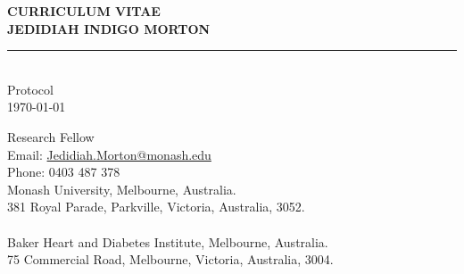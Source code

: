 \documentclass[11pt]{article}
\newcommand{\thedate}{\today}
\begin{document}
\begin{titlepage}
    \begin{center}
        \Huge
        \textbf{CURRICULUM VITAE \\
JEDIDIAH INDIGO MORTON}
\rule{16cm}{2mm} \\
\Large
Protocol \\
\thedate \\
       \vfill
    \end{center}
        \Large

\noindent
Research Fellow \\
\color{blue}
Email: \href{mailto:Jedidiah.Morton@Monash.edu}{Jedidiah.Morton@monash.edu} \\
Phone: 0403 487 378 \\
\color{black}
Monash University, Melbourne, Australia. \\
381 Royal Parade, Parkville, Victoria, Australia, 3052. \\
 \\
Baker Heart and Diabetes Institute, Melbourne, Australia. \\
75 Commercial Road, Melbourne, Victoria, Australia, 3004. \\
\\
\end{titlepage}

\color{white}
\cite{MortonDLOGIA2023}
\color{black}

\clearpage

\end{document}
